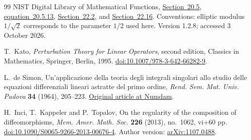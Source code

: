 \documentclass[a4paper,11pt]{article}
\numberwithin{equation}{section}
\theoremstyle{definition}
\theoremstyle{remark}
\begin{document}
\begin{thebibliography}{99}
NIST Digital Library of Mathematical Functions,
\href{https://dlmf.nist.gov/20.5.E13}{Section~20.5, equation~20.5.13},
\href{https://dlmf.nist.gov/22.2}{Section~22.2}, and
\href{https://dlmf.nist.gov/22.16}{Section~22.16}.
Conventions: elliptic modulus $1/\sqrt2$ corresponds to the parameter $1/2$ used here.
Version 1.2.8; accessed 3 October 2026.

T.~Kato,
\emph{Perturbation Theory for Linear Operators}, second edition,
Classics in Mathematics, Springer, Berlin, 1995.
\href{https://doi.org/10.1007/978-3-642-66282-9}{doi:10.1007/978-3-642-66282-9}.

L.~de Simon,
Un'applicazione della teoria degli integrali singolari allo studio delle equazioni differenziali lineari astratte del primo ordine,
\emph{Rend. Sem. Mat. Univ. Padova} \textbf{34} (1964), 205--223.
\href{https://www.numdam.org/item/RSMUP_1964__34__205_0/}{Original article at Numdam}.

H.~Inci, T.~Kappeler and P.~Topalov,
On the regularity of the composition of diffeomorphisms,
\emph{Mem. Amer. Math. Soc.} \textbf{226} (2013), no.~1062, vi+60 pp.
\href{https://doi.org/10.1090/S0065-9266-2013-00676-4}{doi:10.1090/S0065-9266-2013-00676-4}.
Author version: \href{https://arxiv.org/abs/1107.0488}{arXiv:1107.0488}.
\end{thebibliography}
\end{document}
